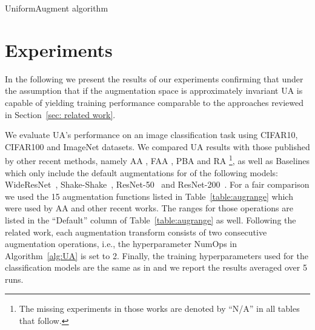 \documentclass[runningheads]{llncs}
\begin{document}
	\begin{algorithm}[htb]
		\SetAlgoLined
		\Input{}
		\BlankLine
\Set{}
		\For{ \KwTo }{
			\;
			\;
			\;
			 \;
		}
		\Return{()}
		\caption{UniformAugment algorithm}
		\label{alg:UA}
	\end{algorithm}
	
	
	\section{Experiments}
	\label{sec:experiments}
	
























	In the following we present the results of our experiments confirming that under the assumption that if the augmentation space is approximately invariant UA is capable of yielding training performance comparable to the approaches reviewed in Section~\ref{sec: related work}.
	
	We evaluate UA's performance on an image classification task using CIFAR10, CIFAR100 \cite{krizhevsky2009learning} and ImageNet \cite{deng2009imagenet} datasets. We compared UA results with those published by other recent methods, namely AA \cite{cubuk2019autoaugment}, FAA \cite{lim2019fast}, PBA \cite{ho2019population} and RA \cite{cubuk2019randaugment}\footnote{The missing experiments in those works are denoted by ``N/A'' in all tables that follow.}, 
	as well as Baselines which only include the default augmentations for of the following models: WideResNet~\cite{wideresnet}, Shake-Shake~\cite{shake-shake}, ResNet-50~\cite{resnet50} and ResNet-200~\cite{resnet200}.
	For a fair comparison we used the 15 augmentation functions  
listed in Table~\ref{table:augrange} which were used by AA and other recent works.  The ranges for those operations are listed in the ``Default'' column of Table~\ref{table:augrange} as well. 
	Following the related work, each augmentation transform consists of two consecutive augmentation operations, i.e., the hyperparameter NumOps in Algorithm~\ref{alg:UA} is set to 2.
Finally, the training hyperparameters used for the classification models are the same as in \cite{lim2019fast} and we report the results averaged over 5 runs.
\end{document}
